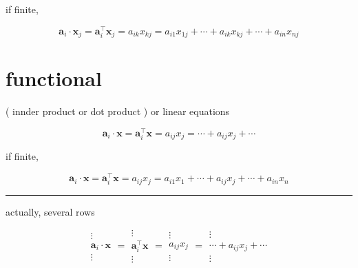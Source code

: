 \documentclass[
]{book}
\theoremstyle{definition}
\theoremstyle{definition}
\theoremstyle{definition}
\theoremstyle{definition}
\theoremstyle{remark}
\begin{document}
if finite,

\[
\boldsymbol{a}_{{\scriptscriptstyle i}}\cdot\boldsymbol{x}_{{\scriptscriptstyle j}}=\boldsymbol{a}_{{\scriptscriptstyle i}}^{\intercal}\boldsymbol{x}_{{\scriptscriptstyle j}}=a_{{\scriptscriptstyle ik}}x_{{\scriptscriptstyle kj}}=a_{{\scriptscriptstyle i1}}x_{{\scriptscriptstyle 1j}}+\cdots+a_{{\scriptscriptstyle ik}}x_{{\scriptscriptstyle kj}}+\cdots+a_{{\scriptscriptstyle in}}x_{{\scriptscriptstyle nj}}
\]

\hypertarget{functional}{%
\section{functional}\label{functional}}

( innder product or dot product ) or linear equations

\[
\boldsymbol{a}_{{\scriptscriptstyle i}}\cdot\boldsymbol{x}=\boldsymbol{a}_{{\scriptscriptstyle i}}^{\intercal}\boldsymbol{x}=a_{{\scriptscriptstyle ij}}x_{{\scriptscriptstyle j}}=\cdots+a_{{\scriptscriptstyle ij}}x_{{\scriptscriptstyle j}}+\cdots
\]

if finite,

\[
\boldsymbol{a}_{{\scriptscriptstyle i}}\cdot\boldsymbol{x}=\boldsymbol{a}_{{\scriptscriptstyle i}}^{\intercal}\boldsymbol{x}=a_{{\scriptscriptstyle ij}}x_{{\scriptscriptstyle j}}=a_{{\scriptscriptstyle i1}}x_{{\scriptscriptstyle 1}}+\cdots+a_{{\scriptscriptstyle ij}}x_{{\scriptscriptstyle j}}+\cdots+a_{{\scriptscriptstyle in}}x_{{\scriptscriptstyle n}}
\]

\begin{center}\rule{0.5\linewidth}{0.5pt}\end{center}

actually, several rows

\[
\begin{array}{c}
\vdots\\
\boldsymbol{a}_{{\scriptscriptstyle i}}\cdot\boldsymbol{x}\\
\vdots
\end{array}=\begin{array}{c}
\vdots\\
\boldsymbol{a}_{{\scriptscriptstyle i}}^{\intercal}\boldsymbol{x}\\
\vdots
\end{array}=\begin{array}{c}
\vdots\\
a_{{\scriptscriptstyle ij}}x_{{\scriptscriptstyle j}}\\
\vdots
\end{array}=\begin{array}{c}
\vdots\\
\cdots+a_{{\scriptscriptstyle ij}}x_{{\scriptscriptstyle j}}+\cdots\\
\vdots
\end{array}
\]
\end{document}
